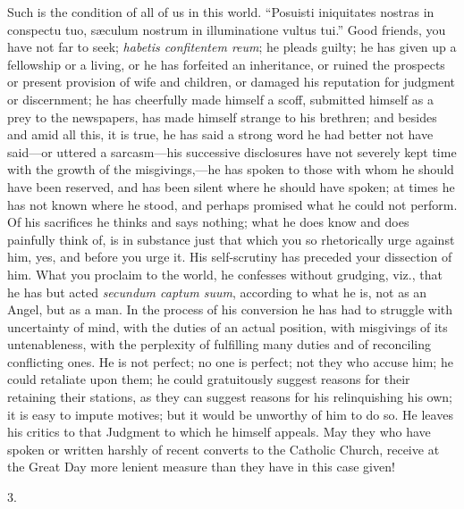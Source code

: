 Such is the condition of all of us in this world.
``Posuisti iniquitates nostras in conspectu tuo, sæculum nostrum in
illuminatione vultus tui.'' Good friends, you have not far to seek; \emph{habetis
confitentem reum}; he pleads guilty; he has given up a fellowship
or a living, or he has forfeited an inheritance, or ruined the
prospects or present provision of wife and children, or damaged his
reputation for judgment or discernment; he has cheerfully made himself
a scoff, submitted himself as a prey to the newspapers, has made
himself strange to his brethren; and besides and amid all this, it is
true, he has said a strong word he had better not have said—or
uttered a sarcasm—his successive disclosures have not severely kept
time with the growth of the misgivings,—he has spoken to those with
whom he should have been reserved, and has been silent where he should
have spoken; at times he has not known where he stood, and perhaps
promised what he could not perform. Of his sacrifices he thinks
and says nothing; what he does know and does painfully think of, is in
substance just that which you so rhetorically urge against him, yes,
and before you urge it. His self-scrutiny has preceded your dissection
of him. What you proclaim to the world, he confesses without grudging,
viz., that he has but acted \emph{secundum captum suum}, according to
what he is, not as an Angel, but as a man. In the process of his
conversion he has had to struggle with uncertainty of mind, with the
duties of an actual position, with misgivings of its untenableness,
with the perplexity of fulfilling many duties and of reconciling
conflicting ones. He is not perfect; no one is perfect; not they who
accuse him; he could retaliate upon them; he could gratuitously
suggest reasons for their retaining their stations, as they can
suggest reasons for his relinquishing his own; it is easy to impute
motives; but it would be unworthy of him to do so. He leaves his
critics to that Judgment to which he himself appeals. May they who
have spoken or written harshly of recent converts to the Catholic
Church, receive at the Great Day more lenient measure than they have
in this case given!

3.

